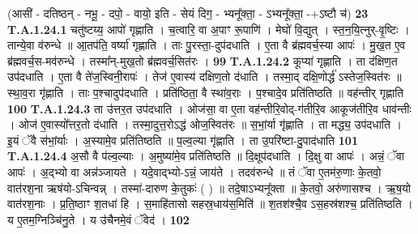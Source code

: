 \documentclass[17pt]{extarticle}
\begin{document}
                  \newline
                                                        (आसी॑ - दतिष्ठन् - नभू॒ - दपो॒ - वायो॒ इति - सेयं दिग॒ - भ्यनू᳚क्ता॒ - ऽभ्यनू᳚क्ता॒ -+ऽष्टौ च॑) \textbf{23} \newline \newline
                                \textbf{ T.A.1.24.1} \newline
                  चतु॑ष्टय्य॒ आपो॑ गृह्णाति । च॒त्वारि॒ वा अ॒पाꣳ रू॒पाणि॑ । मेघो॑ वि॒द्युत् । स्त॒न॒यि॒त्नुर्-वृ॒ष्टिः । तान्ये॒वा व॑रुन्धे ॥ आ॒तप॑ति॒ वर्ष्या॑ गृह्णाति ।  ताः पु॒रस्ता॒-दुप॑दधाति । ए॒ता वै ब्र॑ह्मवर्च॒स्या आपः॑ । मु॒ख॒त ए॒व ब्र॑ह्मवर्च॒स-मव॑रुन्धे ।  तस्मा᳚न्-मुख॒तो ब्र॑ह्मवर्च॒सित॑रः । \textbf{ 99} \newline
                  \newline
                                                                  \textbf{ T.A.1.24.2} \newline
                  कूप्या॑ गृह्णाति । ता द॑क्षिण॒त उप॑दधाति । ए॒ता वै ते॑ज॒स्विनी॒रापः॑ । तेज॑ ए॒वास्य॑ दक्षिण॒तो द॑धाति । तस्मा॒द् दक्षि॒णोर्द्ध॑ ऽस्तेज॒स्वित॑रः ॥  स्था॒व॒रा गृ॑ह्णाति । ताः प॒श्चादुप॑दधाति । प्रति॑ष्ठिता॒ वै स्था॑व॒राः ।  प॒श्चादे॒व प्रति॑तिष्ठति ॥ वह॑न्तीर् गृह्णाति \textbf{ 100} \newline
                  \newline
                                                                  \textbf{ T.A.1.24.3} \newline
                  ता उ॑त्तर॒त उप॑दधाति । ओज॑सा॒ वा ए॒ता वह॑न्तीरि॒वोद्-ग॑तीरि॒व आकूज॑तीरि॒व धाव॑न्तीः । ओज॑ ए॒वास्यो᳚त्तर॒तो द॑धाति । तस्मा॒दुत्त॒रोऽद्ध॑ ओज॒स्वित॑रः ॥ स॒भां॒र्या गृ॑ह्णाति ।  ता मद्ध्य॒ उप॑दधाति । इ॒यं ॅवै स॑भां॒र्याः । अ॒स्यामे॒व प्रति॑तिष्ठति ॥ प॒ल्व॒ल्या गृ॑ह्णाति । ता उ॒परि॑ष्टा-दु॒पाद॑धाति \textbf{ 101} \newline
                  \newline
                                                                  \textbf{ T.A.1.24.4} \newline
                  अ॒सौ वै प॑ल्व॒ल्याः । अ॒मुष्या॑मे॒व प्रति॑तिष्ठति ॥ दि॒क्षूप॑दधाति । दि॒क्षु वा आपः॑ । अन्नं॒ ॅवा आपः॑ । अ॒द्भ्यो वा अन्न॑ञ्जायते । यदे॒वाद्भ्यो-ऽन्नं॒ जाय॑ते । तदव॑रुन्धे ॥ तं ॅवा ए॒तम॑रु॒णाः के॒तवो॒ वात॑रश॒ना ऋष॑यो-ऽचिन्वन्न् । तस्मा॑-दारुण के॒तुकः॑ ( ) ॥ तदे॒षाऽभ्यनू᳚क्ता ॥ के॒तवो॒ अरु॑णासश्च । ऋ॒ष॒यो वात॑रश॒नाः ।  प्र॒ति॒ष्ठाꣳ श॒तधा॑ हि । स॒माहि॑तासो सहस्र॒धाय॑स॒मिति॑ ॥ श॒तश॑श्चै॒व ऽस॒हस्र॑शश्च॒ प्रति॑तिष्ठति । य ए॒तम॒ग्निञ्चि॑नु॒ते ।  य उ॑चैनमे॒वं ॅवेद॑ । \textbf{ 102} \newline
\end{document}
